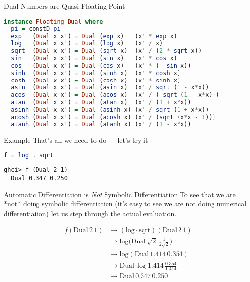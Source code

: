 \documentclass{beamer}
\begin{document}
\begin{frame}[fragile]{Dual Numbers are Quasi Floating Point}
\begin{scriptsize}
\begin{lstlisting}[language=Haskell]
instance Floating Dual where
  pi = constD pi
  exp   (Dual x x') = Dual (exp x)   (x' * exp x)
  log   (Dual x x') = Dual (log x)   (x' / x)
  sqrt  (Dual x x') = Dual (sqrt x)  (x' / (2 * sqrt x))
  sin   (Dual x x') = Dual (sin x)   (x' * cos x)
  cos   (Dual x x') = Dual (cos x)   (x' * (- sin x))
  sinh  (Dual x x') = Dual (sinh x)  (x' * cosh x)
  cosh  (Dual x x') = Dual (cosh x)  (x' * sinh x)
  asin  (Dual x x') = Dual (asin x)  (x' / sqrt (1 - x*x))
  acos  (Dual x x') = Dual (acos x)  (x' / (-sqrt (1 - x*x)))
  atan  (Dual x x') = Dual (atan x)  (x' / (1 + x*x))
  asinh (Dual x x') = Dual (asinh x) (x' / sqrt (1 + x*x))
  acosh (Dual x x') = Dual (acosh x) (x' / (sqrt (x*x - 1)))
  atanh (Dual x x') = Dual (atanh x) (x' / (1 - x*x))
\end{lstlisting}
\end{scriptsize}
\end{frame}


\begin{frame}[fragile]{Example}
That's all we need to do --- let's try it

\begin{scriptsize}
\begin{lstlisting}[language=Haskell]
f = log . sqrt
\end{lstlisting}
\end{scriptsize}

\begin{scriptsize}
\begin{lstlisting}
ghci> f (Dual 2 1)
  Dual 0.347 0.250
\end{lstlisting}
\end{scriptsize}
\end{frame}

\begin{frame}[fragile]{Automatic Differentiation is {\em Not} Symbolic
    Differentiation}
To see that we are *not* doing symbolic differentiation (it's easy to
see we are not doing numerical differentiation) let us step
through the actual evaluation.

$$
\begin{aligned}
f (\mathrm{Dual}\,2\,1) &\longrightarrow (\mathrm{log} \cdot \mathrm{sqrt}) (\mathrm{Dual}\,2\,1) \\
&\longrightarrow \mathrm{log} \bigg(\mathrm{Dual}\,\sqrt{2}\,\frac{1}{2\sqrt{2}}\bigg) \\
&\longrightarrow  \mathrm{log} (\mathrm{Dual}\,1.414\,0.354) \\
&\longrightarrow \mathrm{Dual}\,\log{1.414}\,\frac{0.354}{1.414} \\
&\longrightarrow \mathrm{Dual}\,0.347\,0.250\\
\end{aligned}
$$
\end{frame}
\end{document}
